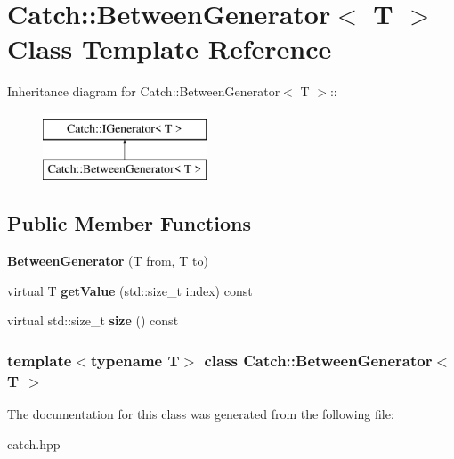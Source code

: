 \hypertarget{classCatch_1_1BetweenGenerator}{
\section{Catch::BetweenGenerator$<$ T $>$ Class Template Reference}
\label{classCatch_1_1BetweenGenerator}
}
Inheritance diagram for Catch::BetweenGenerator$<$ T $>$::\begin{figure}[H]
\begin{center}
\leavevmode
\includegraphics[height=2cm]{classCatch_1_1BetweenGenerator}
\end{center}
\end{figure}
\subsection*{Public Member Functions}
\begin{DoxyCompactItemize}
\item 
\hypertarget{classCatch_1_1BetweenGenerator_a835a057d691ae37caef660624099b51c}{
{\bfseries BetweenGenerator} (T from, T to)}
\label{classCatch_1_1BetweenGenerator_a835a057d691ae37caef660624099b51c}

\item 
\hypertarget{classCatch_1_1BetweenGenerator_af83575d62cc727ca995446cff4d6c26c}{
virtual T {\bfseries getValue} (std::size\_\-t index) const }
\label{classCatch_1_1BetweenGenerator_af83575d62cc727ca995446cff4d6c26c}

\item 
\hypertarget{classCatch_1_1BetweenGenerator_aa53a04a259e796ba2b5adabed79474b5}{
virtual std::size\_\-t {\bfseries size} () const }
\label{classCatch_1_1BetweenGenerator_aa53a04a259e796ba2b5adabed79474b5}

\end{DoxyCompactItemize}
\subsubsection*{template$<$typename T$>$ class Catch::BetweenGenerator$<$ T $>$}



The documentation for this class was generated from the following file:\begin{DoxyCompactItemize}
\item 
catch.hpp\end{DoxyCompactItemize}
